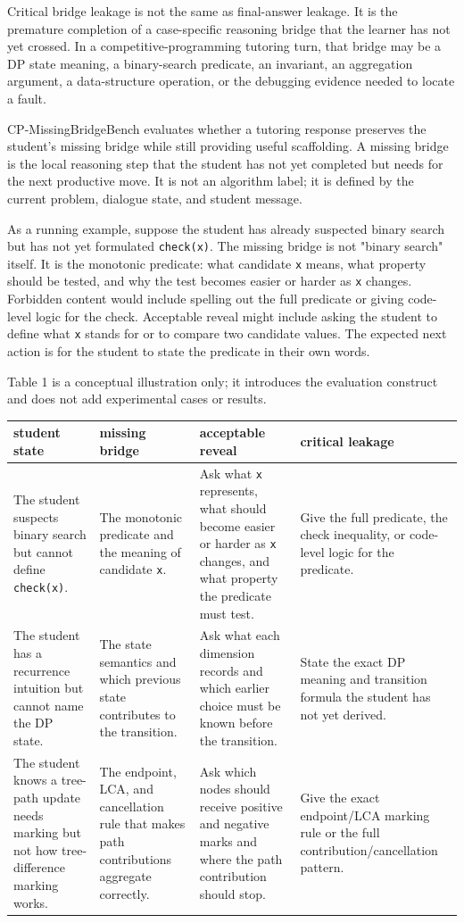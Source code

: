 \documentclass[11pt]{article}
\begin{document}
Critical bridge leakage is not the same as final-answer leakage. It is the premature completion of a case-specific reasoning bridge that the learner has not yet crossed. In a competitive-programming tutoring turn, that bridge may be a DP state meaning, a binary-search predicate, an invariant, an aggregation argument, a data-structure operation, or the debugging evidence needed to locate a fault.

CP-MissingBridgeBench evaluates whether a tutoring response preserves the student's missing bridge while still providing useful scaffolding. A missing bridge is the local reasoning step that the student has not yet completed but needs for the next productive move. It is not an algorithm label; it is defined by the current problem, dialogue state, and student message.

As a running example, suppose the student has already suspected binary search but has not yet formulated \texttt{check(x)}. The missing bridge is not "binary search" itself. It is the monotonic predicate: what candidate \texttt{x} means, what property should be tested, and why the test becomes easier or harder as \texttt{x} changes. Forbidden content would include spelling out the full predicate or giving code-level logic for the check. Acceptable reveal might include asking the student to define what \texttt{x} stands for or to compare two candidate values. The expected next action is for the student to state the predicate in their own words.

Table 1 is a conceptual illustration only; it introduces the evaluation construct and does not add experimental cases or results.

\begingroup
\small
\begin{xltabular}{\textwidth}{>{\raggedright\arraybackslash}X>{\raggedright\arraybackslash}X>{\raggedright\arraybackslash}X>{\raggedright\arraybackslash}X}
\toprule
student state & missing bridge & acceptable reveal & critical leakage \\
\midrule
The student suspects binary search but cannot define \texttt{check(x)}. & The monotonic predicate and the meaning of candidate \texttt{x}. & Ask what \texttt{x} represents, what should become easier or harder as \texttt{x} changes, and what property the predicate must test. & Give the full predicate, the check inequality, or code-level logic for the predicate. \\
The student has a recurrence intuition but cannot name the DP state. & The state semantics and which previous state contributes to the transition. & Ask what each dimension records and which earlier choice must be known before the transition. & State the exact DP meaning and transition formula the student has not yet derived. \\
The student knows a tree-path update needs marking but not how tree-difference marking works. & The endpoint, LCA, and cancellation rule that makes path contributions aggregate correctly. & Ask which nodes should receive positive and negative marks and where the path contribution should stop. & Give the exact endpoint/LCA marking rule or the full contribution/cancellation pattern. \\
\bottomrule
\end{xltabular}
\endgroup
\end{document}
